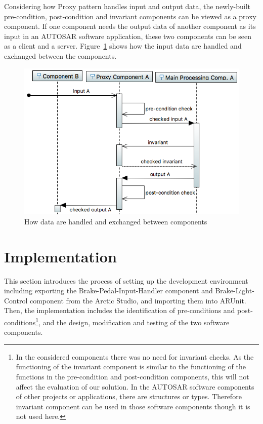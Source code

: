 Considering how Proxy pattern handles input and output data, the newly-built pre-condition, post-condition and invariant components can be viewed as a proxy component. If one component needs the output data of another component as its input in an AUTOSAR software application, these two components can be seen as a client and a server. Figure~\ref{fig:dataExchange} shows how the input data are handled and exchanged between the components.

\begin{figure}[htb]
\centering
\includegraphics[width=\columnwidth]{figure/sequence2.png}
\caption{How data are handled and exchanged between components}
\label{fig:dataExchange}
\end{figure}

\section{Implementation}\label{sec:implementation}
This section introduces the process of setting up the development environment including exporting the Brake-Pedal-Input-Handler component and Brake-Light-Control component from the Arctic Studio, and importing them into ARUnit. Then, the implementation includes the identification of pre-conditions and post-conditions\footnote{In the considered components there was no need for invariant checks. As the functioning of the invariant component is similar to the functioning of the functions in the pre-condition and post-condition components, this will not affect the evaluation of our solution. In the AUTOSAR software components of other projects or applications, there are structures or types. Therefore invariant component can be used in those software components though it is not used here.}, and the design, modification and testing of the two software components. 

